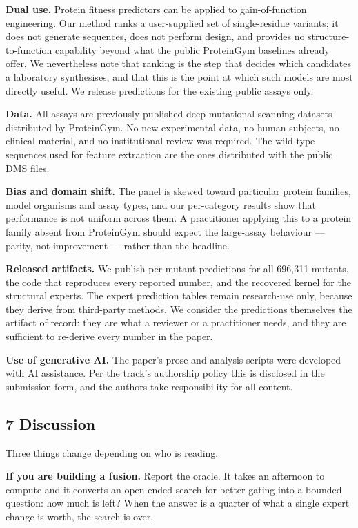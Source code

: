 \textbf{Dual use.} Protein fitness predictors can be applied to gain-of-function engineering. Our method
ranks a user-supplied set of single-residue variants; it does not generate sequences, does not perform
design, and provides no structure-to-function capability beyond what the public ProteinGym baselines
already offer. We nevertheless note that ranking is the step that decides which candidates a laboratory
synthesises, and that this is the point at which such models are most directly useful. We release
predictions for the existing public assays only.

\textbf{Data.} All assays are previously published deep mutational scanning datasets distributed by
ProteinGym. No new experimental data, no human subjects, no clinical material, and no institutional
review was required. The wild-type sequences used for feature extraction are the ones distributed with
the public DMS files.

\textbf{Bias and domain shift.} The panel is skewed toward particular protein families, model organisms and
assay types, and our per-category results show that performance is not uniform across them. A
practitioner applying this to a protein family absent from ProteinGym should expect the large-assay
behaviour --- parity, not improvement --- rather than the headline.

\textbf{Released artifacts.} We publish per-mutant predictions for all 696,311 mutants, the code that
reproduces every reported number, and the recovered kernel for the structural experts. The expert
prediction tables remain research-use only, because they derive from third-party methods. We consider
the predictions themselves the artifact of record: they are what a reviewer or a practitioner needs,
and they are sufficient to re-derive every number in the paper.

\textbf{Use of generative AI.} The paper's prose and analysis scripts were developed with AI assistance.
Per the track's authorship policy this is disclosed in the submission form, and the authors take
responsibility for all content.

\hypertarget{discussion}{%
\subsection{7 Discussion}\label{discussion}}

Three things change depending on who is reading.

\textbf{If you are building a fusion.} Report the oracle. It takes an afternoon to compute and it converts an
open-ended search for better gating into a bounded question: how much is left? When the answer is a
quarter of what a single expert change is worth, the search is over.

